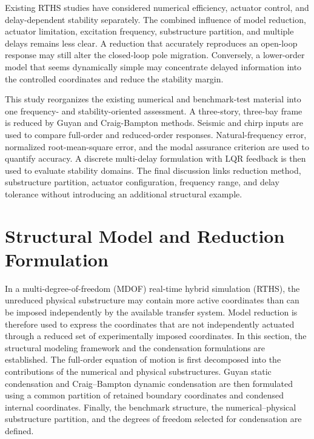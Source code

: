 \documentclass[11pt,a4paper]{article}
\begin{document}
Existing RTHS studies have considered numerical efficiency, actuator control, and delay-dependent stability separately. The combined influence of model reduction, actuator limitation, excitation frequency, substructure partition, and multiple delays remains less clear. A reduction that accurately reproduces an open-loop response may still alter the closed-loop pole migration. Conversely, a lower-order model that seems dynamically simple may concentrate delayed information into the controlled coordinates and reduce the stability margin.

This study reorganizes the existing numerical and benchmark-test material into one frequency- and stability-oriented assessment. A three-story, three-bay frame is reduced by Guyan and Craig-Bampton methods. Seismic and chirp inputs are used to compare full-order and reduced-order responses. Natural-frequency error, normalized root-mean-square error, and the modal assurance criterion are used to quantify accuracy. A discrete multi-delay formulation with LQR feedback is then used to evaluate stability domains. The final discussion links reduction method, substructure partition, actuator configuration, frequency range, and delay tolerance without introducing an additional structural example.

\section{Structural Model and Reduction Formulation} \label{sec2}

In a multi-degree-of-freedom (MDOF) real-time hybrid simulation (RTHS), the unreduced physical substructure may contain more active coordinates than can be imposed independently by the available transfer system. Model reduction is therefore used to express the coordinates that are not independently actuated through a reduced set of experimentally imposed coordinates.
In this section, the structural modeling framework and the condensation formulations are established. The full-order equation of motion is first decomposed into the contributions of the numerical and physical substructures. Guyan static condensation and Craig--Bampton dynamic condensation are then formulated using a common partition of retained boundary coordinates and condensed internal coordinates. Finally, the benchmark structure, the numerical--physical substructure partition, and the degrees of freedom selected for condensation are defined.
\end{document}
